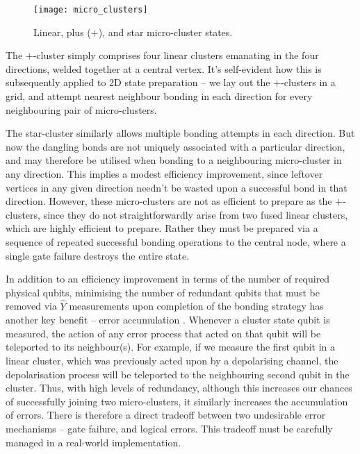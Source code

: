 \begin{figure}[htpb]
\texttt{[image: micro\_clusters]}
\caption{Linear, plus ($+$), and star micro-cluster states.}\label{fig:micro_clusters}
\end{figure}

The $+$-cluster simply comprises four linear clusters emanating in the four directions, welded together at a central vertex. It's self-evident how this is subsequently applied to 2D state preparation -- we lay out the $+$-clusters in a grid, and attempt nearest neighbour bonding in each direction for every neighbouring pair of micro-clusters.

The star-cluster similarly allows multiple bonding attempts in each direction. But now the dangling bonds are not uniquely associated with a particular direction, and may therefore be utilised when bonding to a neighbouring micro-cluster in any direction. This implies a modest efficiency improvement, since leftover vertices in any given direction needn't be wasted upon a successful bond in that direction. However, these micro-clusters are not as efficient to prepare as the $+$-clusters, since they do not straightforwardly arise from two fused linear clusters, which are highly efficient to prepare. Rather they must be prepared via a sequence of repeated successful bonding operations to the central node, where a single gate failure destroys the entire state.

In addition to an efficiency improvement in terms of the number of required physical qubits, minimising the number of redundant qubits that must be removed via $\hat{Y}$ measurements upon completion of the bonding strategy has another key benefit -- error accumulation \cite{RohdeMunroEtal}. Whenever a cluster state qubit is measured, the action of any error process that acted on that qubit will be teleported to its neighbour(s). For example, if we measure the first qubit in a linear cluster, which was previously acted upon by a depolarising channel, the depolarisation process will be teleported to the neighbouring second qubit in the cluster. Thus, with high levels of redundancy, although this increases our chances of successfully joining two micro-clusters, it similarly increases the accumulation of errors. There is therefore a direct tradeoff between two undesirable error mechanisms -- gate failure, and logical errors. This tradeoff must be carefully managed in a real-world implementation.

